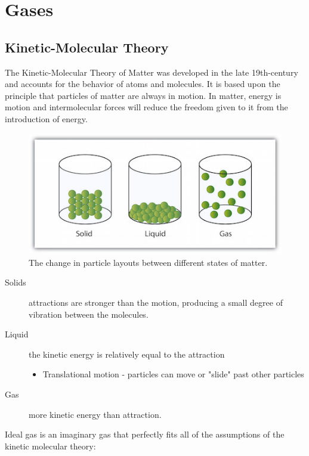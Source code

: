 \chapter{Gases}
\section{Kinetic-Molecular Theory}
The Kinetic-Molecular Theory of Matter was developed in the late 19th-century
and accounts for the behavior of atoms and molecules.  It is based upon the
principle that particles of matter are always in motion.  In matter, energy is
motion and intermolecular forces will reduce the freedom given to it from the
introduction of energy.

\begin{figure}[H]
  \centering
  \includegraphics{res/matter_comp.jpg}
  \caption{The change in particle layouts between different states of matter.}
\end{figure}

\begin{description}
  \item[Solids] attractions are stronger than the motion, producing a small
    degree of vibration between the molecules.
  \item[Liquid] the kinetic energy is relatively equal to the attraction
    \begin{itemize}
      \item Translational motion - particles can move or "slide" past other
        particles
    \end{itemize}
  \item[Gas] more kinetic energy than attraction.
\end{description}

Ideal gas is an imaginary gas that perfectly fits all of the assumptions of the
kinetic molecular theory:

